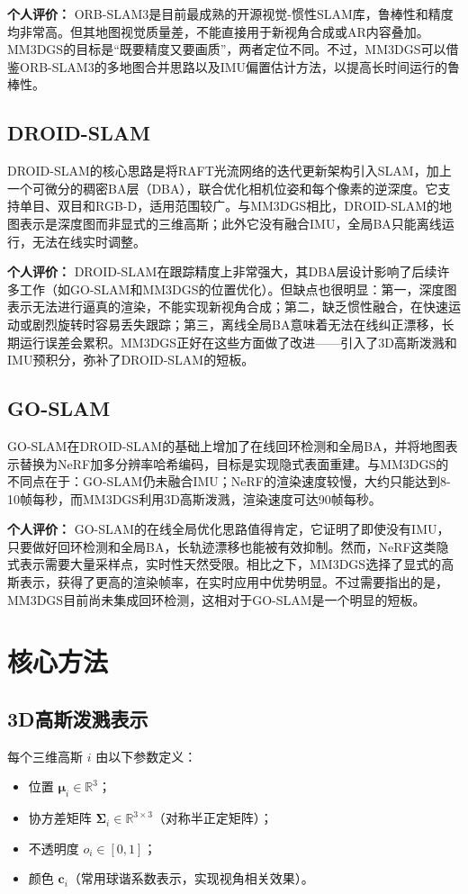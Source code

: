 \documentclass[12pt,a4paper,onecolumn]{article}
\begin{document}
\textbf{个人评价：} ORB-SLAM3是目前最成熟的开源视觉-惯性SLAM库，鲁棒性和精度均非常高。但其地图视觉质量差，不能直接用于新视角合成或AR内容叠加。MM3DGS的目标是“既要精度又要画质”，两者定位不同。不过，MM3DGS可以借鉴ORB-SLAM3的多地图合并思路以及IMU偏置估计方法，以提高长时间运行的鲁棒性。

\subsection{DROID-SLAM \cite{DROID-SLAM}}
DROID-SLAM的核心思路是将RAFT光流网络的迭代更新架构引入SLAM，加上一个可微分的稠密BA层（DBA），联合优化相机位姿和每个像素的逆深度。它支持单目、双目和RGB-D，适用范围较广。与MM3DGS相比，DROID-SLAM的地图表示是深度图而非显式的三维高斯；此外它没有融合IMU，全局BA只能离线运行，无法在线实时调整。

\textbf{个人评价：} DROID-SLAM在跟踪精度上非常强大，其DBA层设计影响了后续许多工作（如GO-SLAM和MM3DGS的位置优化）。但缺点也很明显：第一，深度图表示无法进行逼真的渲染，不能实现新视角合成；第二，缺乏惯性融合，在快速运动或剧烈旋转时容易丢失跟踪；第三，离线全局BA意味着无法在线纠正漂移，长期运行误差会累积。MM3DGS正好在这些方面做了改进——引入了3D高斯泼溅和IMU预积分，弥补了DROID-SLAM的短板。

\subsection{GO-SLAM \cite{GO-SLAM}}
GO-SLAM在DROID-SLAM的基础上增加了在线回环检测和全局BA，并将地图表示替换为NeRF加多分辨率哈希编码，目标是实现隐式表面重建。与MM3DGS的不同点在于：GO-SLAM仍未融合IMU；NeRF的渲染速度较慢，大约只能达到8-10帧每秒，而MM3DGS利用3D高斯泼溅，渲染速度可达90帧每秒。

\textbf{个人评价：} GO-SLAM的在线全局优化思路值得肯定，它证明了即使没有IMU，只要做好回环检测和全局BA，长轨迹漂移也能被有效抑制。然而，NeRF这类隐式表示需要大量采样点，实时性天然受限。相比之下，MM3DGS选择了显式的高斯表示，获得了更高的渲染帧率，在实时应用中优势明显。不过需要指出的是，MM3DGS目前尚未集成回环检测，这相对于GO-SLAM是一个明显的短板。

\section{核心方法}
\subsection{3D高斯泼溅表示}

每个三维高斯 $i$ 由以下参数定义：
\begin{itemize}
    \item 位置 $\boldsymbol{\mu}_i \in \mathbb{R}^3$；
    \item 协方差矩阵 $\boldsymbol{\Sigma}_i \in \mathbb{R}^{3\times 3}$（对称半正定矩阵）；
    \item 不透明度 $o_i \in [0,1]$；
    \item 颜色 $\mathbf{c}_i$（常用球谐系数表示，实现视角相关效果）。
\end{itemize}
\end{document}
